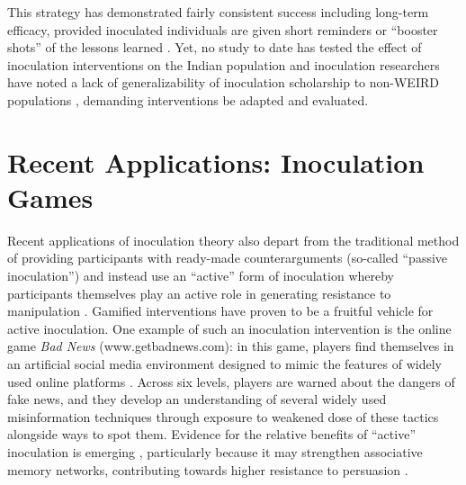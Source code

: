 \documentclass[empirical, authordate]{jote-new-article}
\begin{document}
This strategy has demonstrated fairly consistent success \parencite{Basol2020, Cook2017, Roozenbeek2019} including long-term efficacy, provided inoculated individuals are given short reminders or “booster shots” of the lessons learned \parencite{Maertens2021}. Yet, no study to date has tested the effect of inoculation interventions on the Indian population and inoculation researchers have noted a lack of generalizability of inoculation scholarship to non-WEIRD populations \parencite{Bonetto2018}, demanding interventions be adapted and evaluated.

\section{Recent Applications: Inoculation Games}

Recent applications of inoculation theory also depart from the traditional method of providing participants with ready-made counterarguments (so-called “passive inoculation”) and instead use an “active” form of inoculation whereby participants themselves\textbf{ }play an active role in generating resistance to manipulation \parencite{Roozenbeek2018}. Gamified interventions have proven to be a fruitful vehicle for active inoculation. One example of such an inoculation intervention is the online game \emph{Bad News }(www.getbadnews.com): in this game, players find themselves in an artificial social media environment designed to mimic the features of widely used online platforms \parencite{Basol2020, Maertens2021, Roozenbeek2021, Roozenbeek2019}. Across six levels, players are warned about the dangers of fake news, and they develop an understanding of several widely used misinformation techniques through exposure to weakened dose of these tactics alongside ways to spot them. Evidence for the relative benefits of “active” inoculation is emerging \parencite{Basol2021}, particularly because it may strengthen associative memory networks, contributing towards higher resistance to persuasion \parencite{Pfau2005}.
\end{document}
